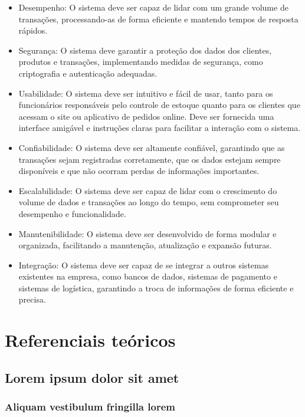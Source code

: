 \documentclass[
	12pt,				%
	openright,			%
	twoside,			%
	a4paper,			%
	english,			%
	brazil				%
	]{abntex2}
\begin{document}
\begin{itemize}
	\item Desempenho: O sistema deve ser capaz de lidar com um grande volume de transações, processando-as de forma eficiente e mantendo tempos de resposta rápidos.
	\item Segurança: O sistema deve garantir a proteção dos dados dos clientes, produtos e transações, implementando medidas de segurança, como criptografia e autenticação adequadas.
	\item Usabilidade: O sistema deve ser intuitivo e fácil de usar, tanto para os funcionários responsáveis pelo controle de estoque quanto para os clientes que acessam o site ou aplicativo de pedidos online. Deve ser fornecida uma interface amigável e instruções claras para facilitar a interação com o sistema.
	\item Confiabilidade: O sistema deve ser altamente confiável, garantindo que as transações sejam registradas corretamente, que os dados estejam sempre disponíveis e que não ocorram perdas de informações importantes.
	\item Escalabilidade: O sistema deve ser capaz de lidar com o crescimento do volume de dados e transações ao longo do tempo, sem comprometer seu desempenho e funcionalidade.
	\item Manutenibilidade: O sistema deve ser desenvolvido de forma modular e organizada, facilitando a manutenção, atualização e expansão futuras.
	\item Integração: O sistema deve ser capaz de se integrar a outros sistemas existentes na empresa, como bancos de dados, sistemas de pagamento e sistemas de logística, garantindo a troca de informações de forma eficiente e precisa.
\end{itemize}


\part{Referenciais teóricos}

\chapter{Lorem ipsum dolor sit amet}

\section{Aliquam vestibulum fringilla lorem}
\end{document}
